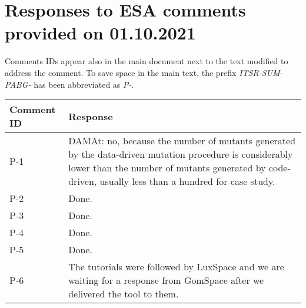 
\section{Responses to ESA comments provided on 01.10.2021}
\label{sec:ESA:comments:2}

Comments IDs appear also in the main document next to the text modified to address the comment. To save space in the main text, the prefix \emph{ITSR-SUM-PABG-} has been abbreviated as \emph{P-}.

\setlength\LTleft{0pt}
\setlength\LTright{0pt}
\footnotesize
\begin{longtable}{|p{1.5cm}|p{12cm}|@{}}
\textbf{Comment ID}&\textbf{Response}\\
\hline
P-1&
\begin{minipage}{12cm}
DAMAt: no, because the number of mutants generated by the data-driven mutation procedure is considerably lower than the number of mutants generated by code-driven, usually less than a hundred for case study.
\end{minipage}\\
\hline

P-2&
\begin{minipage}{12cm}
Done.
\end{minipage}\\
\hline

P-3&
\begin{minipage}{12cm}
Done.
\end{minipage}\\
\hline

P-4&
\begin{minipage}{12cm}
Done.
\end{minipage}\\
\hline

P-5&
\begin{minipage}{12cm}
Done.
\end{minipage}\\
\hline

P-6&
\begin{minipage}{12cm}
The tutorials were followed by LuxSpace and we are waiting for a response from GomSpace after we delivered the tool to them.
\end{minipage}\\
\hline



\end{longtable}
\normalsize

\clearpage
